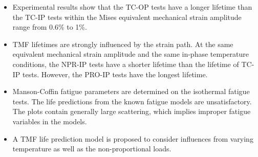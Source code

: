 \begin{itemize}
\item Experimental results show that the TC-OP tests have a longer lifetime than the TC-IP tests within the Mises equivalent mechanical strain amplitude range from 0.6\% to 1\%.

\item TMF lifetimes are strongly influenced by the strain path. At the same equivalent mechanical strain amplitude and the same in-phase temperature conditions, the NPR-IP tests have a shorter lifetime than the lifetime of TC-IP tests. However, the PRO-IP tests have the longest lifetime.

\item Manson-Coffin fatigue parameters are determined on the isothermal fatigue tests. The life predictions from the known fatigue models are unsatisfactory. The plots contain generally large scattering, which implies improper fatigue variables in the models.

\item A TMF life prediction model is proposed to consider influences from varying temperature as well as the non-proportional loads.
\end{itemize}
